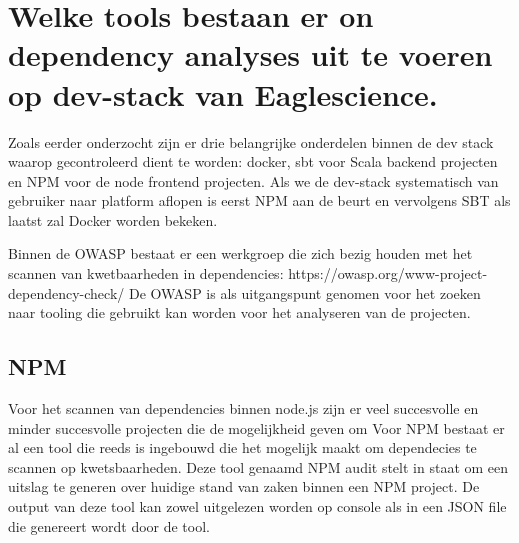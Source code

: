 \section{Welke tools bestaan er on dependency analyses uit te voeren op dev-stack van Eaglescience.}
Zoals eerder onderzocht zijn er drie belangrijke onderdelen binnen de dev stack waarop gecontroleerd dient te worden: docker, sbt voor Scala backend projecten en NPM voor de node frontend projecten. Als we de dev-stack systematisch van gebruiker naar platform aflopen is eerst NPM aan de beurt en vervolgens SBT als laatst zal Docker worden bekeken.

Binnen de OWASP bestaat er een werkgroep die zich bezig houden met het scannen van kwetbaarheden in dependencies: https://owasp.org/www-project-dependency-check/  De OWASP is als uitgangspunt genomen voor het zoeken naar tooling die gebruikt kan worden voor het analyseren van de projecten.


\subsection{NPM}\label{subsec:npm}
Voor het scannen van dependencies binnen node.js zijn er veel succesvolle en minder succesvolle projecten die de mogelijkheid geven om
Voor NPM bestaat er al een tool die reeds is ingebouwd die het mogelijk maakt om dependecies te scannen op kwetsbaarheden. Deze tool genaamd NPM audit stelt in staat om een uitslag te generen over huidige stand van zaken binnen een NPM project. De output van deze tool kan zowel uitgelezen worden op console als in een JSON file die genereert wordt door de tool.

